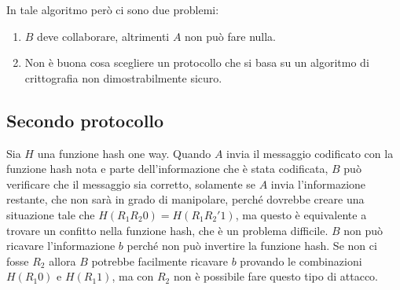 In tale algoritmo però ci sono due problemi:
\begin{enumerate}
  \item $B$ deve collaborare, altrimenti $A$ non può fare nulla.
  \item Non è buona cosa scegliere un protocollo che si basa su un algoritmo di crittografia
  non dimostrabilmente sicuro.
\end{enumerate}
\subsection{Secondo protocollo}
Sia $H$ una funzione hash one way.
Quando $A$ invia il messaggio codificato con la funzione hash nota e parte dell'informazione 
che è stata codificata, $B$ può verificare che il messaggio sia corretto, solamente se
$A$ invia l'informazione restante, che non sarà in grado di manipolare, perché dovrebbe 
creare una situazione tale che $H(R_1 R_2 0) = H(R_1 R_2' 1)$, ma questo è
equivalente a trovare un confitto nella funzione hash, che è un problema difficile.
$B$ non può ricavare l'informazione $b$ perché non può invertire la funzione hash.
Se non ci fosse $R_2$ allora $B$ potrebbe facilmente ricavare $b$ provando le combinazioni 
$H(R_1 0)$ e $H(R_1 1)$, ma con $R_2$ non è possibile fare questo tipo di attacco.

